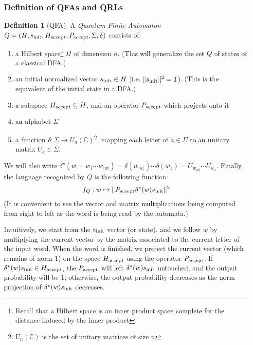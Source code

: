 \documentclass[12pt,a4paper]{article}
\theoremstyle{plain}
\theoremstyle{definition}
\newtheorem*{definition}{Definition}
\begin{document}
\subsubsection{Definition of QFAs and QRLs}
\begin{definition}[QFA]
    A \emph{Quantum Finite Automaton} $Q=(H, s_{\textnormal{init}}, H_{\textnormal{accept}}, P_{\textnormal{accept}}, \Sigma, \delta)$ consists of:
    \begin{enumerate}[label=--, noitemsep]
        \item a Hilbert space\footnote{Recall that a Hilbert space is an inner product space complete for the distance induced by the inner product} $H$ of dimension $n$. (This will generalize the set $Q$ of states of a classical DFA.)
        \item an initial normalized vector $s_{\textnormal{init}}\in H$ (i.e. $\|s_{\textnormal{init}}\|^2=1$). (This is the equivalent of the initial state in a DFA.)
        \item a subspace $H_{\textnormal{accept}} \subseteq H$, and an operator $P_{\textnormal{accept}}$ which projects onto it
        \item an alphabet $\Sigma$
        \item a function $\delta : \Sigma \to U_n(\mathbb{C})$\footnote{$U_n(\mathbb{C})$ is the set of unitary matrices of size $n$}, mapping each letter of $a\in\Sigma$ to an unitary matrix $U_a\in\Sigma$.
    \end{enumerate}
    
    We will also write $\delta^\star(w=w_1\cdots w_{|w|}) = \delta(w_{|w|})\cdots \delta(w_1) = U_{w_{|w|}}\cdots U_{w_1}$. Finally, the language recognized by $Q$ is the following function:
    \begin{equation*}
        f_Q : w \mapsto \|P_{\textnormal{accept}}\delta^\star(w)s_{\textnormal{init}}\|^2
    \end{equation*}
    (It is convenient to see the vector and matrix multiplications being computed from right to left as the word is being read by the automata.)
\end{definition}

Intuitively, we start from the $s_{\textnormal{init}}$ vector (or state), and we follow $w$ by multiplying the current vector by the matrix associated to the current letter of the input word. When the word is finished, we project the current vector (which remains of norm $1$) on the space $H_{\textnormal{accept}}$ using the operator $P_{\textnormal{accept}}$. If $\delta^\star(w)s_{\textnormal{init}}\in H_{\textnormal{accept}}$, the $P_{\textnormal{accept}}$ will left $\delta^\star(w)s_{\textnormal{init}}$ untouched, and the output probability will be $1$; otherwise, the output probability decreases as the norm projection of $\delta^\star(w)s_{\textnormal{init}}$ decreases.
\end{document}
